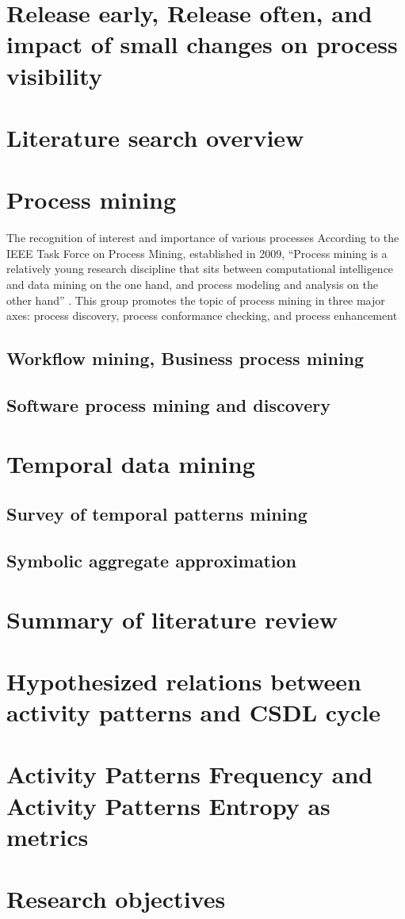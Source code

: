 \section{Release early, Release often, and impact of small changes on process visibility}

\section{Literature search overview}

\section{Process mining}
The recognition of interest and importance of various processes 
According to the IEEE Task Force on Process Mining, established in 2009, ``Process mining is 
a relatively young research discipline that sits between computational intelligence and data 
mining on the one hand, and process modeling and analysis on the other hand'' \cite{citeulike:11077707}.
This group promotes the topic of process mining in three major axes: process discovery,
process conformance checking, and process enhancement 

\subsection{Workflow mining, Business process mining}\label{mackground.bpm}


\subsection{Software process mining and discovery}\label{mackground.bpm}


\section{Temporal data mining}
\subsection{Survey of temporal patterns mining}
\subsection{Symbolic aggregate approximation}

\section{Summary of literature review}

\section{Hypothesized relations between activity patterns and CSDL cycle}

\section{Activity Patterns Frequency and Activity Patterns Entropy as metrics}

\section{Research objectives}